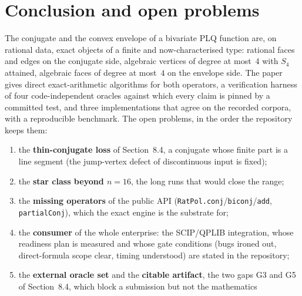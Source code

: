 \documentclass[11pt]{article}
\theoremstyle{definition}
\begin{document}
\section{Conclusion and open problems}

The conjugate and the convex envelope of a bivariate PLQ function are, on
rational data, exact objects of a finite and now-characterised type: rational
faces and edges on the conjugate side, algebraic vertices of degree at most~$4$
with $S_4$ attained, algebraic faces of degree at most~$4$ on the envelope side.
The paper gives direct exact-arithmetic algorithms for both operators, a
verification harness of four code-independent oracles against which every claim
is pinned by a committed test, and three implementations that agree on the recorded corpora, with a
reproducible benchmark. The open problems, in the order the repository keeps
them:
\begin{enumerate}[label=(\roman*),leftmargin=*]
\item the \textbf{thin-conjugate loss} of Section~8.4, a conjugate whose finite
  part is a line segment (the jump-vertex defect of discontinuous input is
  fixed);
\item the \textbf{star class beyond $n=16$}, the long runs that would close the
  range;
\item the \textbf{missing operators} of the public API
  (\texttt{RatPol.conj}/\texttt{biconj}/\texttt{add}, \texttt{partialConj}),
  which the exact engine is the substrate for;
\item the \textbf{consumer} of the whole enterprise: the SCIP/QPLIB
  integration, whose readiness plan is measured and whose gate conditions
  (bugs ironed out, direct-formula scope clear, timing understood) are stated
  in the repository;
\item the \textbf{external oracle set} and the \textbf{citable artifact}, the
  two gaps G3 and G5 of Section~8.4, which block a submission but not the
  mathematics
\end{enumerate}



\end{document}

